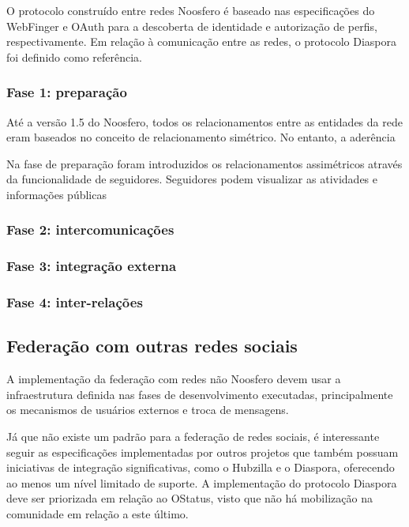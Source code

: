 O protocolo construído entre redes Noosfero é baseado nas especificações do
WebFinger e OAuth para a descoberta de identidade e autorização de perfis,
respectivamente. Em relação à comunicação entre as redes, o protocolo Diaspora foi
definido como referência. 

\subsubsection{Fase 1: preparação}

Até a versão 1.5 do Noosfero, todos os relacionamentos entre as entidades da rede
eram baseados no conceito de relacionamento simétrico. No entanto, a aderência

Na fase de preparação foram introduzidos os relacionamentos assimétricos através da
funcionalidade de seguidores. Seguidores podem visualizar as atividades e
informações públicas

\subsubsection{Fase 2: intercomunicações}


\subsubsection{Fase 3: integração externa}


\subsubsection{Fase 4: inter-relações}



\subsection{Federação com outras redes sociais}

A implementação da federação com redes não Noosfero devem usar a infraestrutura
definida nas fases de desenvolvimento executadas, principalmente os mecanismos
de usuários externos e troca de mensagens.

Já que não existe um padrão para a federação de redes sociais, é interessante
seguir as especificações implementadas por outros projetos que também possuam
iniciativas de integração significativas, como o Hubzilla e o Diaspora, oferecendo
ao menos um nível limitado de suporte. A implementação do protocolo Diaspora deve
ser priorizada em relação ao OStatus, visto que não há mobilização na comunidade em
relação a este último.

